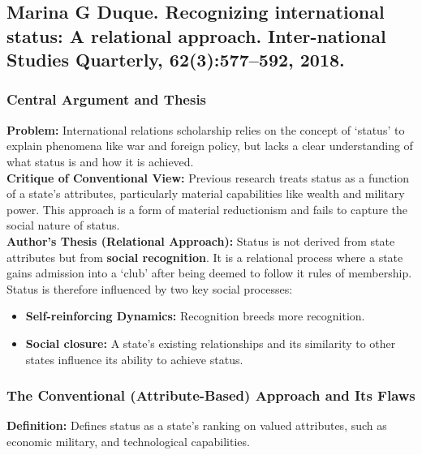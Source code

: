 \documentclass{article}
\begin{document}
    \subsection{Marina G Duque. Recognizing international status: A relational approach. Inter-national Studies Quarterly, 62(3):577–592, 2018.}

    \subsubsection{Central Argument and Thesis}
    \noindent \textbf{Problem:} International relations scholarship relies
on the concept of `status' to explain phenomena like war and foreign policy,
but lacks a clear understanding of what status is and how it is achieved.\\

    \noindent \textbf{Critique of Conventional View:} Previous research
treats status as a function of a state's attributes, particularly material
capabilities like wealth and military power. This approach is a form of
material reductionism and fails to capture the social nature of status.\\

    \noindent \textbf{Author's Thesis (Relational Approach):} Status is not
derived from state attributes but from \textbf{social recognition}. It is a
relational process where a state gains admission into a `club' after being
deemed to follow it rules of membership. Status is therefore influenced by
two key social processes:
    \begin{itemize}
        \item \textbf{Self-reinforcing Dynamics:} Recognition breeds more
        recognition.
        \item \textbf{Social closure:} A state's existing relationships and
        its similarity to other states influence its ability to achieve status.
    \end{itemize}

    \subsubsection{The Conventional (Attribute-Based) Approach and Its Flaws}

    \noindent \textbf{Definition:} Defines status as a state's ranking on
valued attributes, such as economic military, and technological capabilities.\\
\end{document}
